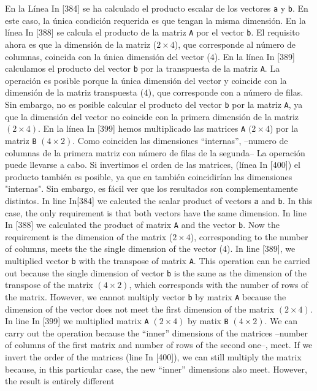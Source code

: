 \begin{paracol}{2}
En la Línea In [384] se ha calculado el producto escalar de los vectores \texttt{a} y \texttt{b}. En este caso, la única condición requerida es que tengan la misma dimensión. En la línea In [388] se calcula el producto de la matriz \texttt{A} por el vector \texttt{b}. El requisito ahora es que la dimensión de la matriz ($2\times 4$), que corresponde al número de columnas, coincida con la única dimensión del vector ($4$). En la línea In [389] calculamos el producto del vector \texttt{b} por la transpuesta de la matriz \texttt{A}. La operación es posible porque la única dimensión del vector y coincide con la dimensión  de la matriz transpuesta $(4\time2)$, que corresponde con a número de filas. Sin embargo, no es posible calcular el producto del vector \texttt{b} por la matriz \texttt{A}, ya que la dimensión del vector no coincide con la primera dimensión de la matriz $(2\times4)$. En la línea In [399] hemos multiplicado las matrices \texttt{A} $(2\times 4$) por la matriz \texttt{B} $(4\times 2)$. Como coinciden las dimensiones ``internas'', --numero de columnas de la primera matriz con número de filas de la segunda-- La operación puede llevarse a cabo. Si invertimos el orden de las matrices, (línea In [400]) el producto también es posible, ya que en también coincidirían las dimensiones "internas". Sin embargo, es fácil ver que los resultados son complementamente distintos.
\switchcolumn
In line In[384] we calcuted the scalar product of vectors \texttt{a} and \texttt{b}. In this case, the only requirement is that both vectors have the same dimension. In line In [388] we calculated the product of matrix \texttt{A} and the vector \texttt{b}. Now the requirement is the dimension of the matrix ($2\times 4$), corresponding to the number of columns, meets the the single dimension of the vector ($4$). In line [389], we multiplied vector \texttt{b} with the transpose of matrix \texttt{A}. This operation can be carried out because the single dimension of vector \texttt{b} is the same as the dimension of the transpose of the matrix $(4\times 2)$, which corresponds with the number of rows of the matrix. However, we cannot multiply vector \texttt{b} by matrix \texttt{A} because the dimension of the vector does not meet the first dimension of the matrix $(2\times 4)$. In line In [399] we multiplied matrix \texttt{A} $(2\times 4)$ by matix \texttt{B} $(4\times 2)$. We can carry out the operation because the ``inner'' dimensions of the matrices --number of columns of the first matrix and number of rows of the second one--, meet. If we invert the order of the matrices (line In [400]), we can still multiply the matrix because, in this particular case, the new ``inner'' dimensions also meet. However, the result is entirely different        
\end{paracol}
